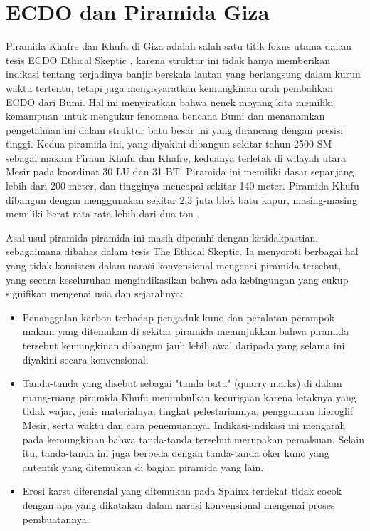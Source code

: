 \documentclass[10pt,twocolumn,letterpaper]{article}
\begin{document}
\section{ECDO dan Piramida Giza}

Piramida Khafre dan Khufu di Giza adalah salah satu titik fokus utama dalam tesis ECDO Ethical Skeptic \cite{27}, karena struktur ini tidak hanya memberikan indikasi tentang terjadinya banjir berskala lautan yang berlangsung dalam kurun waktu tertentu, tetapi juga mengisyaratkan kemungkinan arah pembalikan ECDO dari Bumi. Hal ini menyiratkan bahwa nenek moyang kita memiliki kemampuan untuk mengukur fenomena bencana Bumi dan menanamkan pengetahuan ini dalam struktur batu besar ini yang dirancang dengan presisi tinggi. Kedua piramida ini, yang diyakini dibangun sekitar tahun 2500 SM sebagai makam Firaun Khufu dan Khafre, keduanya terletak di wilayah utara Mesir pada koordinat 30 LU dan 31 BT. Piramida ini memiliki dasar sepanjang lebih dari 200 meter, dan tingginya mencapai sekitar 140 meter. Piramida Khufu dibangun dengan menggunakan sekitar 2,3 juta blok batu kapur, masing-masing memiliki berat rata-rata lebih dari dua ton \cite{24, 25}.

Asal-usul piramida-piramida ini masih dipenuhi dengan ketidakpastian, sebagaimana dibahas dalam tesis The Ethical Skeptic. Ia menyoroti berbagai hal yang tidak konsisten dalam narasi konvensional mengenai piramida tersebut, yang secara keseluruhan mengindikasikan bahwa ada kebingungan yang cukup signifikan mengenai usia dan sejarahnya:

\begin{flushleft}
\begin{itemize}
    \item Penanggalan karbon terhadap pengaduk kuno dan peralatan perampok makam yang ditemukan di sekitar piramida menunjukkan bahwa piramida tersebut kemungkinan dibangun jauh lebih awal daripada yang selama ini diyakini secara konvensional.
    \item Tanda-tanda yang disebut sebagai "tanda batu" (quarry marks) di dalam ruang-ruang piramida Khufu menimbulkan kecurigaan karena letaknya yang tidak wajar, jenis materialnya, tingkat pelestariannya, penggunaan hieroglif Mesir, serta waktu dan cara penemuannya. Indikasi-indikasi ini mengarah pada kemungkinan bahwa tanda-tanda tersebut merupakan pemalsuan. Selain itu, tanda-tanda ini juga berbeda dengan tanda-tanda oker kuno yang autentik yang ditemukan di bagian piramida yang lain.
    \item Erosi karst diferensial yang ditemukan pada Sphinx terdekat tidak cocok dengan apa yang dikatakan dalam narasi konvensional mengenai proses pembuatannya.
\end{itemize}
\end{flushleft}
\end{document}

